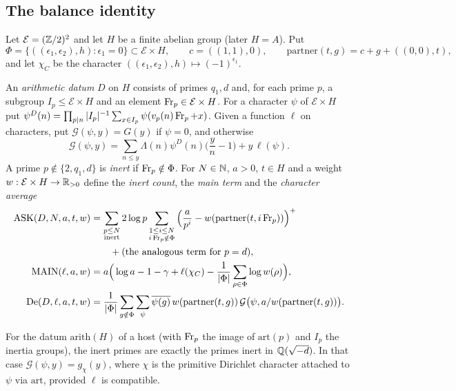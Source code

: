 \subsection{The balance identity}

Let $\mathcal E=(\mathbb{Z}/2)^2$ and let $H$ be a finite abelian group (later $H=A$). Put
\[
\Phi=\{((\epsilon_1,\epsilon_2),h):\epsilon_1=0\}\subset\mathcal E\times H,\qquad
c=((1,1),0),\qquad \mathrm{partner}(t,g)=c+g+((0,0),t),
\]
and let $\chi_C$ be the character $((\epsilon_1,\epsilon_2),h)\mapsto(-1)^{\epsilon_1}$.

\begin{definition}\label{def:hosts:arith}
An \emph{arithmetic datum} $D$ on $H$ consists of primes $q_1,d$ and, for each prime $p$, a subgroup
$I_p\le\mathcal E\times H$ and an element $\operatorname{Fr}_p\in\mathcal E\times H$. For a character $\psi$ of
$\mathcal E\times H$ put $\psi^D(n)=\prod_{p\mid n}|I_p|^{-1}\sum_{x\in I_p}\psi(v_p(n)\operatorname{Fr}_p+x)$. Given a
function $\ell$ on characters, put $\mathcal G(\psi,y)=G(y)$ if $\psi=0$, and otherwise
\[
\mathcal G(\psi,y)=\sum_{n\le y}\Lambda(n)\psi^D(n)\Big(\frac yn-1\Big)+y\,\ell(\psi).
\]
A prime $p\notin\{2,q_1,d\}$ is \emph{inert} if $\operatorname{Fr}_p\notin\Phi$. For $N\in\mathbb{N}$, $a>0$, $t\in H$ and a
weight $w:\mathcal E\times H\to\mathbb{R}_{>0}$ define the \emph{inert count}, the \emph{main term} and the
\emph{character average}
\begin{align*}
\mathrm{ASK}(D,N,a,t,w)&=\sum_{\substack{p\le N\\ \text{inert}}}2\log p\sum_{\substack{1\le i\le N\\ i\operatorname{Fr}_p\notin\Phi}}
\Big(\frac a{p^i}-w(\mathrm{partner}(t,i\operatorname{Fr}_p))\Big)^+\\
&\qquad+(\text{the analogous term for }p=d),\\
\mathrm{MAIN}(\ell,a,w)&=a\Big(\log a-1-\gamma+\ell(\chi_C)-\frac1{|\Phi|}\sum_{\rho\in\Phi}\log w(\rho)\Big),\\
\mathrm{De}(D,\ell,a,t,w)&=\frac1{|\Phi|}\sum_{g\notin\Phi}\sum_\psi\overline{\psi(g)}\,w(\mathrm{partner}(t,g))\,
\mathcal G\big(\psi,a/w(\mathrm{partner}(t,g))\big).
\end{align*}
\end{definition}

For the datum $\mathrm{arith}(H)$ of a host (with $\operatorname{Fr}_p$ the image of $\mathrm{art}(p)$ and $I_p$ the
inertia groups), the inert primes are exactly the primes inert in $\mathbb{Q}(\sqrt{-d})$. In that case
$\mathcal G(\psi,y)=g_{\chi}(y)$, where $\chi$ is the primitive Dirichlet character attached to $\psi$
via $\mathrm{art}$, provided $\ell$ is compatible.

